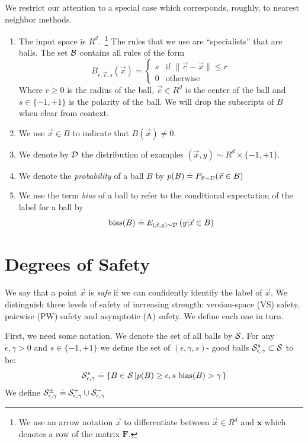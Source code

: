 \documentclass{article}
\newcommand{\D}{{\cal D}}
\newcommand{\B}{{\cal B}}
\newcommand{\x}{\vec{x}}
\newcommand{\cc}{\vec{c}}
\renewcommand{\SS}{{\cal S}} %
\newcommand{\CC}{{\cal C}}  %
\newcommand{\vF}{\mathbf{F}}
\newcommand{\vx}{\mathbf{x}}
\newcommand{\bias}{\text{bias}}
\begin{document}
We restrict our attention to a special case which corresponds,
roughly, to nearest neighbor methods.
\begin{enumerate}
  \item The input space is $R^d$.~\footnote{We use an arrow notation $\x$ to
    differentiate between $\x \in R^d$ and $\vx$ which denotes a row
    of the matrix $\vF$.}
    The rules that we use are ``specialists'' that are balls. The set
    $\B$ contains all rules of the form 
    \[
    B_{r,\cc,s}(\x) =
    \begin{cases}
      s & \text{if } \| \cc- \x \| \leq r \\
    0 & \text{otherwise }
    \end{cases}
    \]
    Where $r \geq 0$ is the radius of the ball, $\cc \in R^d$ is the
    center of the ball and $s \in \{-1,+1\}$ is the polarity of the ball.
    We will drop the subscripts of $B$ when clear from context.
  \item
    We use $\x \in B$ to indicate that $B(\x) \neq 0$.
  \item
    We denote by $\D$ the distribution of examples $(\x,y) \sim R^d
    \times \{-1,+1\}$.
  \item
    We denote the {\em probability} of a ball $B$ by $p(B) \doteq
    P_{\x \sim \D}(\x \in B)$
  \item
    We use the term {\em bias} of a ball to refer to the conditional
    expectation of the label for a ball by
    $$
    \bias(B) \doteq E_{(\x,y)\sim\D}\left( y|\x \in B \right)
    $$
\end{enumerate}

\newcommand{\edge}{\gamma}
\newcommand{\SepsGamSig}{\SS_{\epsilon,\edge}^{s}}
\newcommand{\SepsGam}{\SS_{\epsilon,\edge}}
\newcommand{\SepsGamMinusSig}{\SS_{\epsilon,\edge}^{-s}}
\newcommand{\ConstrepsGamSig}{\CC_{\epsilon,\edge}^{s}}
\newcommand{\ConstrepsGam}{\CC_{\epsilon,\edge}}
\newcommand{\ConstrepsGamMinusSig}{\CC_{\epsilon,\edge}^{-s}}

\section{Degrees of Safety}
We say that a point $\x$ is {\em safe} if we can confidently identify
the label of $\x$. We distinguish three levels of safety of
increasing strength: version-space (VS) safety, pairwise (PW) safety and
asymptotic (A) safety. We define each one in turn.

First, we need some notation. We denote the set of all balls by $\SS$. For any $\epsilon,\edge>0$
and $s \in \{-1,+1\}$ we define the set of $(\epsilon,\edge,s)$-
good balls $\SepsGamSig \subset \SS$ to be:
\[
\SepsGamSig \doteq \left\{B \in \SS \left| p(B) \geq \epsilon,
s\; \bias(B) > \edge \right. \right\}
\]
We define $\SepsGam^{\pm} \doteq \SepsGam^{+} \cup \SepsGam^{-}$
\end{document}

